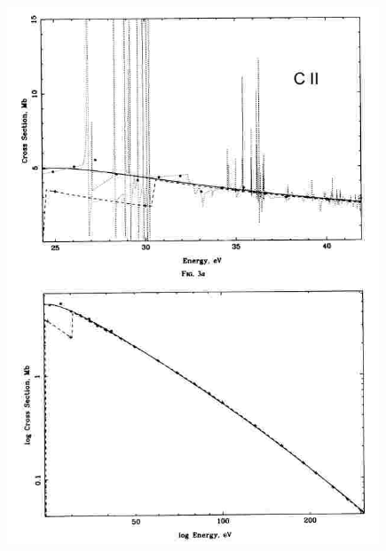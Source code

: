\begin{minipage}[t]{13cm}
  \begin{center}
    \includegraphics[width=12.5cm,height=16cm]{./C/cii_photion.jpg}
  \end{center}
\end{minipage}





